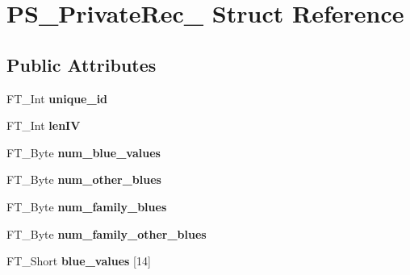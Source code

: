 \hypertarget{struct_p_s___private_rec__}{}\section{P\+S\+\_\+\+Private\+Rec\+\_\+ Struct Reference}
\label{struct_p_s___private_rec__}
\subsection*{Public Attributes}
\begin{DoxyCompactItemize}
\item 
F\+T\+\_\+\+Int {\bfseries unique\+\_\+id}\hypertarget{struct_p_s___private_rec___ae862c1db170cfee85aa3242be9fa5d57}{}\label{struct_p_s___private_rec___ae862c1db170cfee85aa3242be9fa5d57}

\item 
F\+T\+\_\+\+Int {\bfseries len\+IV}\hypertarget{struct_p_s___private_rec___a796ebb92d96f0297ae584a911768db8b}{}\label{struct_p_s___private_rec___a796ebb92d96f0297ae584a911768db8b}

\item 
F\+T\+\_\+\+Byte {\bfseries num\+\_\+blue\+\_\+values}\hypertarget{struct_p_s___private_rec___ae3c56e75b5674451a7296cbb9f0a2e40}{}\label{struct_p_s___private_rec___ae3c56e75b5674451a7296cbb9f0a2e40}

\item 
F\+T\+\_\+\+Byte {\bfseries num\+\_\+other\+\_\+blues}\hypertarget{struct_p_s___private_rec___a149acdf871b0739f7ab13b1ac8e48a28}{}\label{struct_p_s___private_rec___a149acdf871b0739f7ab13b1ac8e48a28}

\item 
F\+T\+\_\+\+Byte {\bfseries num\+\_\+family\+\_\+blues}\hypertarget{struct_p_s___private_rec___a1e8a432c78f00034c73cfc54c787b10f}{}\label{struct_p_s___private_rec___a1e8a432c78f00034c73cfc54c787b10f}

\item 
F\+T\+\_\+\+Byte {\bfseries num\+\_\+family\+\_\+other\+\_\+blues}\hypertarget{struct_p_s___private_rec___a7370e2e89f39f7ff8923f3d1befbcfce}{}\label{struct_p_s___private_rec___a7370e2e89f39f7ff8923f3d1befbcfce}

\item 
F\+T\+\_\+\+Short {\bfseries blue\+\_\+values} \mbox{[}14\mbox{]}\hypertarget{struct_p_s___private_rec___ae2c23ed06e54b680473f924483685425}{}\label{struct_p_s___private_rec___ae2c23ed06e54b680473f924483685425}


\end{DoxyCompactItemize}
